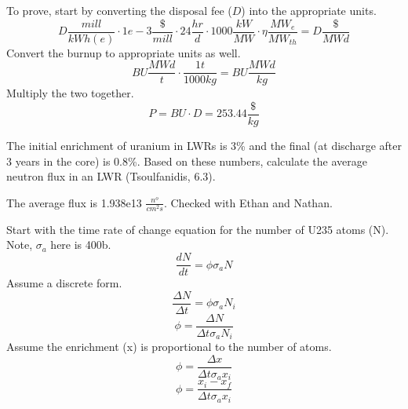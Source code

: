 \documentclass[11pt,answers,addpoints]{exam}
\begin{document}
\begin{questions}
\begin{solution}
        To prove, start by converting the disposal fee ($D$) into the appropriate units.
        \begin{equation}
            D \frac{mill}{kWh(e)} \cdot
            1e-3 \frac{\$}{mill} \cdot
            24 \frac{hr}{d} \cdot
            1000 \frac{kW}{MW} \cdot
            \eta \frac{MW_e}{MW_{th}} = 
            D \frac{\$}{MWd}
        \end{equation}
        Convert the burnup to appropriate units as well.
        \begin{equation}
            BU \frac{MWd}{t} \cdot \frac{1 t}{1000 kg} = BU \frac{MWd}{kg}
        \end{equation}
        Multiply the two together.
        \begin{equation}
            P = BU \cdot D = 253.44 \frac{\$}{kg}
        \end{equation}
        \end{solution}

        \question[15] The initial enrichment of uranium in LWRs is 3\% and the 
        final (at discharge after 3 years in the core) is 0.8\%. Based on these 
        numbers, calculate the average neutron flux in an LWR (Tsoulfanidis, 
        6.3).

        \begin{solution}
        The average flux is 1.938e13 $\frac{n^o}{cm^2s}$. Checked with Ethan and Nathan.

        Start with the time rate of change equation for the number of U235 atoms (N). Note, $\sigma_a$ here is 400b.
        \begin{equation}
            \frac{dN}{dt} = \phi \sigma_{a} N
        \end{equation}
        Assume a discrete form.
        \begin{equation}
            \frac{\Delta N}{\Delta t} = \phi \sigma_{a} N_i
        \end{equation}
        \begin{equation}
            \phi = \frac{\Delta N}{\Delta t \sigma_{a} N_i}
        \end{equation}
        Assume the enrichment (x) is proportional to the number of atoms.
        \begin{equation}
            \phi = \frac{\Delta x}{\Delta t \sigma_{a} x_i}
        \end{equation}
        \begin{equation}
            \phi = \frac{x_i - x_f}{\Delta t \sigma_{a} x_i}
        \end{equation}
        \end{solution}



\end{questions}
\end{document}
